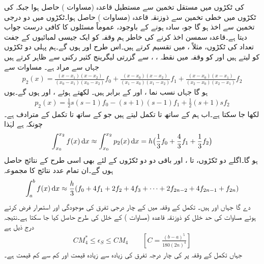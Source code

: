  کی ٹکڑوں میں مستقل تخمین سے مستطیل قاعدہ (مساوات ) حاصل ہوا جبکہ  کی ٹکڑوں میں خطی تخمین سے ذوزنقہ قاعدہ (مساوات ) حاصل ہوا۔ٹکڑوں میں دو درجی تخمین سے  اخذ ہو گا جو، سادہ ہونے کے باوجود،  عموماً مسئلوں کا کافی درست جواب دیتا ہے۔قاعدہ سمسن  اخذ کرنے کی خاطر ہم وقفہ  کو ایک جیسی لمبائیوں کے  جفت تعداد کی  ٹکڑوں، مثلاً ، میں تقسیم کرتے ہیں۔اس طرح  اور   ہوں گے۔ہم پہلی دو ٹکڑوں  کو لیتے ہیں اور   کو وقفہ  میں نقطہ ، ،  سے گزرتی  لیگرینج کثیر رکنی  سے ظاہر کرتے ہیں جہاں  سے مراد  ہے۔ مساوات  سے
\begin{multline}\label{مساوات_اعدادی_لیگرینج_کثیر_رکنی_الف}
p_2(x)=\frac{(x-x_1)(x-x_2)}{(x_0-x_1)(x_0-x_2)}f_0+\frac{(x-x_0)(x-x_2)}{(x_1-x_0)(x_1-x_2)}f_1+\frac{(x-x_0)(x-x_1)}{(x_2-x_0)(x_2-x_1)}f_2
\end{multline}
ہو گا جہاں نسب نما ،  اور  کے برابر ہیں۔  لکھتے ہوئے  ،  اور  ہوں گے۔یوں 
\begin{align}
p_2(x)=\frac{1}{2}s(s-1)f_0-(s+1)(s-1)f_1+\frac{1}{2}(s+1)sf_2
\end{align}
لکھا جا سکتا ہے۔اب ہم  کے ساتھ  تا  تکمل لیتے ہیں جو  کے ساتھ  تا  تکمل کے مترادف ہے۔چونکہ  ہے لہٰذا
\begin{align*}
\int_{x_0}^{x_2}f(x)\dif x\approx \int_{x_0}^{x_2}p_2(x)\dif x=h\big(\frac{1}{3}f_0+\frac{4}{3}f_1+\frac{1}{3}f_2\big)
\end{align*}
ہو گا۔اگلے دو ٹکڑوں،  تا ، اور باقی دو دو ٹکڑوں  کے لئے بھی  اسی طرح کے نتائج حاصل ہوں گے۔ان تمام  عدد نتائج کا مجموعہ 
\begin{align}\label{مساوات_اعدادی_تکمل_سمسن_قاعدہ}
\int_a^b f(x)\dif x\approx \frac{h}{3}(f_0+4f_1+2f_2+4f_3+\cdots+2f_{2n-2}+4f_{2n-1}+f_{2n})
\end{align}
دے گا جہاں  اور  ہیں۔ تکمل کے وقفہ میں  کے چار درجی تفرق کی موجودگی اور استمرار فرض کرتے ہوئے مساوات  کی حد خلل  کو ذوزنقہ قاعدہ (مساوات ) کے خلل کی طرح حاصل کیا جا سکتا ہے۔نتیجہ درج ذیل ہے
\begin{align}\label{مساوات_اعدادی_سمسن_حد_خلل}
CM_4^*\le \epsilon_S\le CM_4\quad \quad [C=\tfrac{(b-a)^5}{180(2n)^4}]
\end{align}
جہاں تکمل کے وقفہ پر  کی چار درجہ تفرق کی زیادہ سے زیادہ قیمت  اور کم سے کم قیمت  ہے۔

